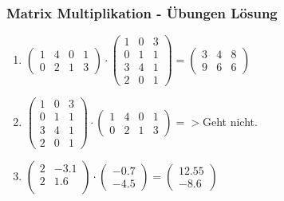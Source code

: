 \begin{frame}
\frametitle{Matrix Multiplikation - Übungen Lösung}
\begin{enumerate}
\item $ \begin{pmatrix} 
1 & 4 & 0 & 1\\ 
0 & 2 & 1 & 3 
\end{pmatrix} 
\cdot 
\begin{pmatrix} 
1 & 0 & 3 \\ 
0 & 1 & 1\\
3 & 4 & 1\\
2 & 0 & 1
\end{pmatrix} 
= 
\begin{pmatrix} 
3 & 4 & 8 \\ 
9 & 6 & 6
\end{pmatrix} $
\item 
$\begin{pmatrix} 
1 & 0 & 3 \\ 
0 & 1 & 1\\
3 & 4 & 1\\
2 & 0 & 1
\end{pmatrix} 
\cdot 
\begin{pmatrix} 
1 & 4 & 0 & 1\\ 
0 & 2 & 1 & 3 
\end{pmatrix} 
=> $Geht nicht.
\item
$\begin{pmatrix}
2 & -3.1 \\
2 & 1.6 \\
\end{pmatrix}
\cdot
\begin{pmatrix}
-0.7 \\
-4.5 
\end{pmatrix}
=
\begin{pmatrix}
12.55 \\
-8.6
\end{pmatrix}$
\end{enumerate}
\end{frame}

